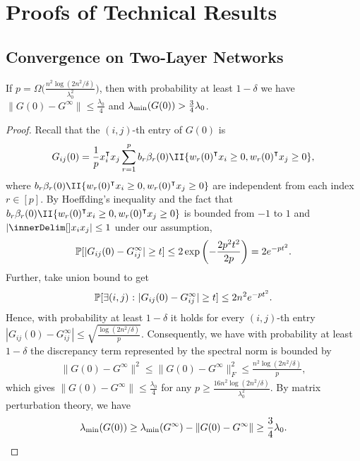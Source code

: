 \section{Proofs of Technical Results}

\subsection{Convergence on Two-Layer Networks}

\begin{lemma}
    If $p = \Omega\big( \frac{n^2\log(2n^2/\delta)}{\lambda_0^2} \big)$, then with probability at least $1-\delta$ we have $\|G(0)-G^\infty\| \leq \frac{\lambda_0}{4}$ and $\lambda_\mathrm{min}(G(0)) > \frac{3}{4}\lambda_0$.
\end{lemma}

\begin{proof}
    Recall that the $(i,j)$-th entry of $G(0)$ is
    \begin{align*}
        G_{ij}(0) = \frac{1}{p} x_i\transpose x_j \sum_{r=1}^p b_r\beta_r(0)\II\{w_r(0)\transpose x_i\geq 0, w_r(0)\transpose x_j\geq 0\},
    \end{align*}
    where $b_r\beta_r(0)\II\{w_r(0)\transpose x_i\geq 0, w_r(0)\transpose x_j\geq 0\}$ are independent from each index $r\in [p]$. By Hoeffding's inequality and the fact that $b_r\beta_r(0)\II\{w_r(0)\transpose x_i\geq 0, w_r(0)\transpose x_j\geq 0\}$ is bounded from $-1$ to $1$ and $|\inner{x_i}{x_j}|\leq 1$ under our assumption,
    \begin{align*}
        \operatorname{\mathbb{P}}[ |G_{ij}(0) - G^\infty_{ij}| \geq t ] \leq 2 \exp\left( -\frac{2p^2t^2}{2p} \right) = 2 e^{-pt^2}.
    \end{align*} 
    Further, take union bound to get
    \begin{align*}
        \operatorname{\mathbb{P}}[ \exists (i,j) \operatorname*{\,:\,} |G_{ij}(0) - G^\infty_{ij}| \geq t ] \leq 2n^2 e^{-pt^2}.
    \end{align*}
    Hence, with probability at least $1-\delta$ it holds for every $(i,j)$-th entry $|G_{ij}(0) - G^\infty_{ij}| \leq \sqrt{\frac{\log(2n^2/\delta)}{p}}$. Consequently, we have with probability at least $1-\delta$ the discrepancy term represented by the spectral norm is bounded by
    \begin{align*}
        \|G(0)-G^\infty\|^2 \leq \|G(0)-G^\infty\|_F^2 \leq \frac{n^2\log(2n^2/\delta)}{p},
    \end{align*}
    which gives $\|G(0)-G^\infty\| \leq \frac{\lambda_0}{4}$ for any $p \geq \frac{16n^2\log(2n^2/\delta)}{\lambda_0^2}$. By matrix perturbation theory, we have
    \begin{align*}
        \lambda_\mathrm{min}(G(0)) \geq \lambda_\mathrm{min}(G^\infty) - \|G(0)-G^\infty\| \geq \frac{3}{4}\lambda_0.
    \end{align*}
\end{proof}

